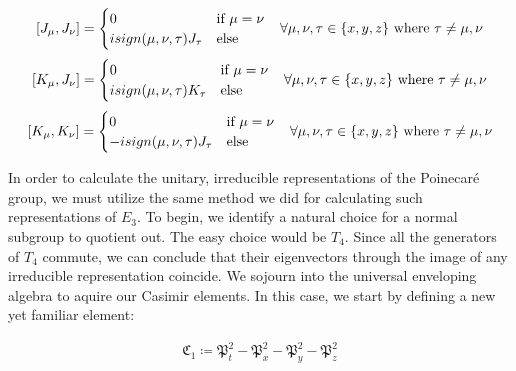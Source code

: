 \begin{equation}
\begin{aligned}
	[J_\mu,J_\nu] = \begin{cases}
							0 &\text{if } \mu=\nu \\
							isign(\mu,\nu,\tau)J_\tau & \text{else}
						\end{cases} \hspace{3mm} \forall \mu,\nu,\tau\in\{x,y,z\}\text{ where }\tau \neq\mu,\nu
\end{aligned}
\end{equation}
\begin{equation}
\begin{aligned}
	[K_\mu,J_\nu] = \begin{cases}
							0 &\text{if } \mu=\nu \\
							isign(\mu,\nu,\tau)K_\tau & \text{else}
						\end{cases} \hspace{3mm} \forall \mu,\nu,\tau\in\{x,y,z\}\text{ where }\tau \neq\mu,\nu
\end{aligned}
\end{equation}
\begin{equation}
\begin{aligned}
	[K_\mu,K_\nu] = \begin{cases}
							0 &\text{if } \mu=\nu \\
							-isign(\mu,\nu,\tau)J_\tau & \text{else}
						\end{cases} \hspace{3mm} \forall \mu,\nu,\tau\in\{x,y,z\}\text{ where }\tau \neq\mu,\nu
\end{aligned}
\end{equation}

In order to calculate the unitary, irreducible representations of the Poinecar\'e group, we must utilize the same method we did for calculating such representations of $E_3$. To begin, we identify a natural choice for a normal subgroup to quotient out. The easy choice would be $T_4$. Since all the generators of $T_4$ commute, we can conclude that their eigenvectors through the image of any irreducible representation coincide. We sojourn into the universal enveloping algebra to aquire our Casimir elements. In this case, we start by defining a new yet familiar element:

 
\begin{equation}
\begin{aligned}
	\mathfrak{C}_1 \coloneq \mathfrak{P}_t^2 -  \mathfrak{P}_x^2 -\mathfrak{P}_y^2- \mathfrak{P}_z^2
\end{aligned}
\end{equation}

